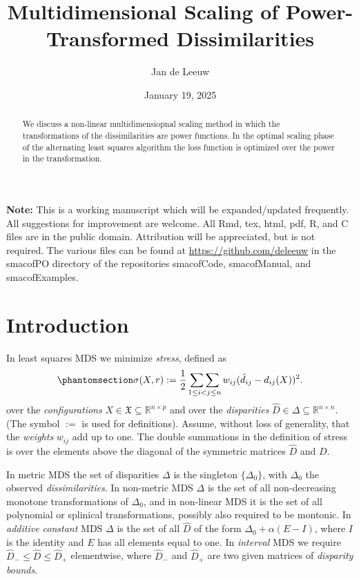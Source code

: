 \documentclass[
  12pt,
  letterpaper,
  DIV=11,
  numbers=noendperiod]{scrartcl}
\title{Multidimensional Scaling of Power-Transformed Dissimilarities}
\author{Jan de Leeuw}
\date{January 19, 2025}
\newcommand{\sectionbreak}{\clearpage}
\renewcommand*\contentsname{Table of contents}
\newcommand\contentsname{Table of contents}
\begin{document}
\maketitle
\begin{abstract}
We discuss a non-linear multidimensiopnal scaling method in which the
transformations of the dissimilarities are power functions. In the
optimal scaling phase of the alternating least squares algorithm the
loss function is optimized over the power in the transformation.
\end{abstract}

\renewcommand*\contentsname{Table of contents}
{
\hypersetup{linkcolor=}
\setcounter{tocdepth}{3}
\tableofcontents
}

\textbf{Note:} This is a working manuscript which will be
expanded/updated frequently. All suggestions for improvement are
welcome. All Rmd, tex, html, pdf, R, and C files are in the public
domain. Attribution will be appreciated, but is not required. The
various files can be found at \url{https://github.com/deleeuw} in the
smacofPO directory of the repositories smacofCode, smacofManual, and
smacofExamples.

\sectionbreak

\section{Introduction}\label{introduction}

In least squares MDS we minimize \emph{stress}, defined as
\begin{equation}\phantomsection\label{eq-stressdef}{
\sigma(X, r):=\frac12\mathop{\sum\sum}_{1\leq i<j\leq n} w_{ij}(\hat d_{ij}-d_{ij}(X))^2.
}\end{equation} over the \emph{configurations}
\(X\in\mathfrak{X}\subseteq\mathbb{R}^{n\times p}\) and over the
\emph{disparities} \(\hat D\in\Delta\subseteq\mathbb{R}^{n\times n}\).
(The symbol \(:=\) is used for definitions). Assume, without loss of
generality, that the \emph{weights} \(w_{ij}\) add up to one. The double
summations in the definition of stress is over the elements above the
diagonal of the symmetric matrices \(\hat D\) and \(D\).

In metric MDS the set of disparities \(\Delta\) is the singleton
\(\{\Delta_0\}\), with \(\Delta_0\) the observed \emph{dissimilarities}.
In non-metric MDS \(\Delta\) is the set of all non-decreasing monotone
transformations of \(\Delta_0\), and in non-linear MDS it is the set of
all polynomial or splinical transformations, possibly also required to
be montonic. In \emph{additive constant} MDS \(\Delta\) is the set of
all \(\hat D\) of the form \(\Delta_0+\alpha(E-I)\), where \(I\) is the
identity and \(E\) has all elements equal to one. In \emph{interval} MDS
we require \(\hat D_-\leq\hat D\leq\hat D_+\) elementwise, where
\(\hat D_-\) and \(\hat D_+\) are two given matrices of \emph{disparity
bounds}.
\end{document}
